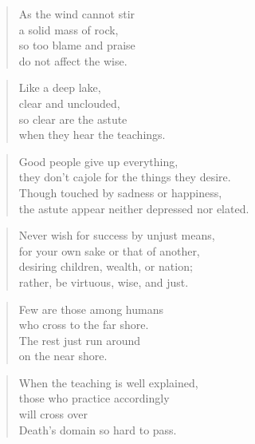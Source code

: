 \documentclass[12pt,openany]{book}%
\begin{document}
\begin{verse}%
As the wind cannot stir \\
a solid mass of rock, \\
so too blame and praise \\
do not affect the wise. 

%
\end{verse}

\begin{verse}%
Like a deep lake, \\
clear and unclouded, \\
so clear are the astute \\
when they hear the teachings. 

%
\end{verse}

\begin{verse}%
Good people give up everything, \\
they don’t cajole for the things they desire. \\
Though touched by sadness or happiness, \\
the astute appear neither depressed nor elated. 

%
\end{verse}

\begin{verse}%
Never wish for success by unjust means, \\
for your own sake or that of another, \\
desiring children, wealth, or nation; \\
rather, be virtuous, wise, and just. 

%
\end{verse}

\begin{verse}%
Few are those among humans \\
who cross to the far shore. \\
The rest just run around \\
on the near shore. 

%
\end{verse}

\begin{verse}%
When the teaching is well explained, \\
those who practice accordingly \\
will cross over \\
Death’s domain so hard to pass. 

%
\end{verse}
\end{document}
